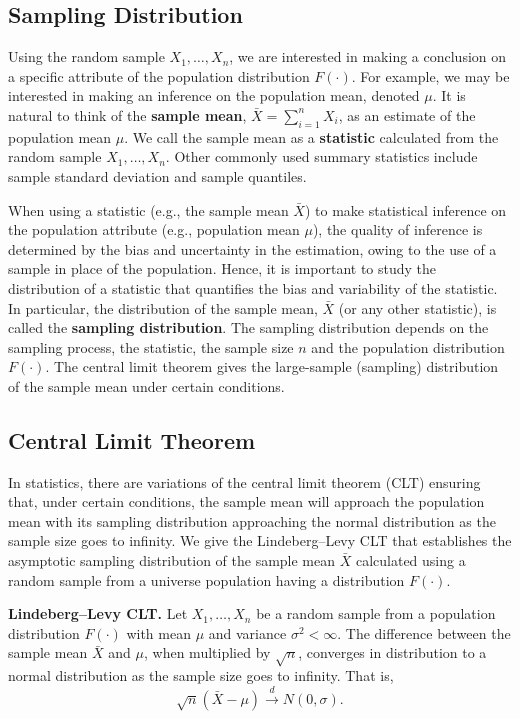 \documentclass[]{book}
\theoremstyle{definition}
\theoremstyle{definition}
\theoremstyle{definition}
\theoremstyle{remark}
\begin{document}
\subsection{Sampling Distribution}\label{sampling-distribution}

Using the random sample \(X_1, \ldots, X_n\), we are interested in
making a conclusion on a specific attribute of the population
distribution \(F(\cdot)\). For example, we may be interested in making
an inference on the population mean, denoted \(\mu\). It is natural to
think of the \textbf{sample mean}, \(\bar{X}=\sum_{i=1}^nX_i\), as an
estimate of the population mean \(\mu\). We call the sample mean as a
\textbf{statistic} calculated from the random sample
\(X_1, \ldots, X_n\). Other commonly used summary statistics include
sample standard deviation and sample quantiles.

When using a statistic (e.g., the sample mean \(\bar{X}\)) to make
statistical inference on the population attribute (e.g., population mean
\(\mu\)), the quality of inference is determined by the bias and
uncertainty in the estimation, owing to the use of a sample in place of
the population. Hence, it is important to study the distribution of a
statistic that quantifies the bias and variability of the statistic. In
particular, the distribution of the sample mean, \(\bar{X}\) (or any
other statistic), is called the \textbf{sampling distribution}. The
sampling distribution depends on the sampling process, the statistic,
the sample size \(n\) and the population distribution \(F(\cdot)\). The
central limit theorem gives the large-sample (sampling) distribution of
the sample mean under certain conditions.

\subsection{Central Limit Theorem}\label{central-limit-theorem}

In statistics, there are variations of the central limit theorem (CLT)
ensuring that, under certain conditions, the sample mean will approach
the population mean with its sampling distribution approaching the
normal distribution as the sample size goes to infinity. We give the
Lindeberg--Levy CLT that establishes the asymptotic sampling
distribution of the sample mean \(\bar{X}\) calculated using a random
sample from a universe population having a distribution \(F(\cdot)\).

\textbf{Lindeberg--Levy CLT.} Let \(X_1, \ldots, X_n\) be a random
sample from a population distribution \(F(\cdot)\) with mean \(\mu\) and
variance \(\sigma^2<\infty\). The difference between the sample mean
\(\bar{X}\) and \(\mu\), when multiplied by \(\sqrt{n}\), converges in
distribution to a normal distribution as the sample size goes to
infinity. That is,
\[\sqrt{n}(\bar{X}-\mu)\xrightarrow[]{d}N(0,\sigma).\]
\end{document}
